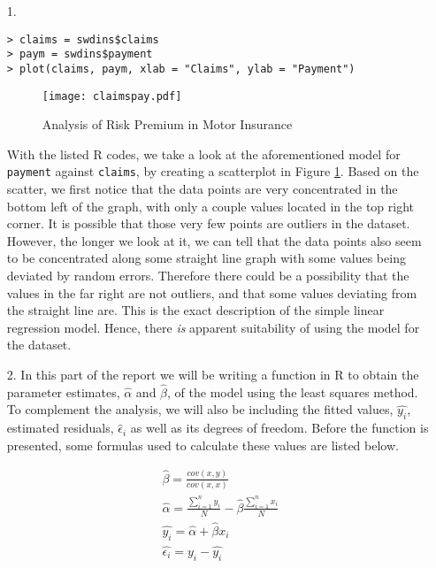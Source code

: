 \documentclass[11pt,a4]{article}
\begin{document}
\begin{itemize}	
	
\item[1.]
\begin{verbatim}
> claims = swdins$claims
> paym = swdins$payment
> plot(claims, paym, xlab = "Claims", ylab = "Payment")
\end{verbatim}

\begin{figure}[hbt!]
    \centering
    \texttt{[image: claimspay.pdf]}
    \caption{Analysis of Risk Premium in Motor Insurance}
    \label{fig:1}
\end{figure}

With the listed R codes, we take a look at the aforementioned model for \verb|payment| against \verb|claims|, by creating a scatterplot in Figure \ref{fig:1}. Based on the scatter, we first notice that the data points are very concentrated in the bottom left of the graph, with only a couple values located in the top right corner. It is possible that those very few points are outliers in the dataset. However, the longer we look at it, we can tell that the data points also seem to be concentrated along some straight line graph with some values being deviated by random errors. Therefore there could be a possibility that the values in the far right are not outliers, and that some values deviating from the straight line are. This is the exact description of the simple linear regression model. Hence, there \emph{is} apparent suitability of using the model for the dataset.

\item[2.]
In this part of the report we will be writing a function in R to obtain the parameter estimates, $\hat{\alpha}$ and $\hat{\beta}$, of the model using the least squares method. To complement the analysis, we will also be including the fitted values, $\hat{y_{i}}$, estimated residuals, $\hat{\epsilon}_{i}$ as well as its degrees of freedom. Before the function is presented, some formulas used to calculate these values are listed below.

\begin{align}
\ \hat{\beta} = \frac{cov(x,y)}{cov(x,x)}\\
\ \hat{\alpha} = \frac{\sum_{i=1}^{n} y_{i}}{N} - \hat{\beta}\frac{\sum_{i=1}^{n} x_{i}}{N} \\
\ \hat{y_{i}} = \hat{\alpha} + \hat{\beta} x_{i} \\
\ \hat{\epsilon_{i}} = y_{i} - \hat{y_{i}}
\end{align}
 

\end{itemize}
\end{document}
